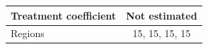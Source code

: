\begingroup
\centering
\begin{tabular}{lc}
\toprule
Treatment coefficient & Not estimated\\
\midrule
Regions & 15, 15, 15, 15\\
\bottomrule
\end{tabular}
\par\endgroup
